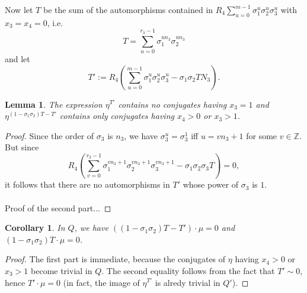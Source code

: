 \documentclass[12pt,a4paper]{article}
\newtheorem{lemma}[theorem]{Lemma}
\newtheorem{cor}[theorem]{Corollary}
\theoremstyle{definition}
\newcommand{\Z}{\mathbb{Z}}
\begin{document}
Now let $T$ be the sum of the automorphisms contained in  $R_4\sum_{u=0}^{m-1}\sigma_1^{u}\sigma_2^{u}\sigma_3^{u}$ with $x_3=x_4=0$, i.e. $$T=\sum_{u=0}^{r_3-1}\sigma_1^{un_3}\sigma_2^{un_3}$$
and let $$T':=R_4\left(\sum_{u=0}^{m-1}\sigma_1^{u}\sigma_2^{u}\sigma_3^{u}-\sigma_1\sigma_2 TN_3\right).$$
\begin{lemma}
The expression $\eta^{T'}$ contains no conjugates having $x_3=1$  and $\eta^{(1-\sigma_1\sigma_2)T-T'}$ contains only conjugates having $x_4>0$ or $x_3>1$. %
\end{lemma}
\begin{proof}
Since the order of $\sigma_3$ is $n_3$, we have $\sigma_3^u=\sigma_3^1$ iff $u=vn_3+1$ for some $v\in\Z$. But since $$R_4\left(\sum_{v=0}^{r_3-1}\sigma_1^{vn_3+1}\sigma_2^{vn_3+1}\sigma_3^{vn_3+1}-\sigma_1\sigma_2 \sigma_3T\right)=0,$$
it follows that there are no automorphisms in $T'$ whose power of $\sigma_3$ is $1$.
\paragraph*{}
Proof of the second part...
\end{proof}

\begin{cor}
In $Q$, we have $((1-\sigma_1\sigma_2)T-T')\cdot \mu=0$ and $(1-\sigma_1\sigma_2)T\cdot \mu=0$.
\end{cor}
\begin{proof}
The first part is immediate, because the conjugates of $\eta$ having $x_4>0$ or $x_3>1$ become trivial in $Q$. The second equality follows from the fact that $T'\sim 0$, hence $T'\cdot \mu =0$ (in fact, the image of $\eta^{T'}$ is alredy trivial in $Q'$).
\end{proof}
\end{document}
